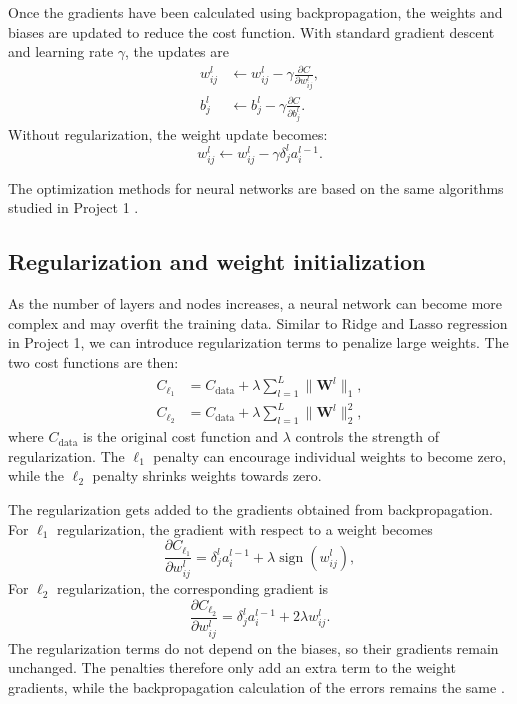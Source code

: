 \documentclass[amssymb,secnumarabic,twocolumn,aps]{revtex4}
\begin{document}
Once the gradients have been calculated using backpropagation, the weights and biases are updated to reduce the cost function. With standard gradient descent and learning rate $\gamma$, the updates are
\begin{align*}
    w_{ij}^l
     & \leftarrow
    w_{ij}^l-\gamma
    \frac{\partial C}{\partial w_{ij}^l}, \\
    b_j^l
     & \leftarrow
    b_j^l-\gamma
    \frac{\partial C}{\partial b_j^l}.
\end{align*}
Without regularization, the weight update becomes:
\begin{equation*}
    w_{ij}^l
    \leftarrow
    w_{ij}^l-\gamma\delta_j^l a_i^{l-1}.
\end{equation*}

The optimization methods for neural networks are based on the same algorithms studied in Project 1 \cite{project1}.

\subsection{Regularization and weight initialization}

As the number of layers and nodes increases, a neural network can become more complex and may overfit the training data. Similar to Ridge and Lasso regression in Project 1, we can introduce regularization terms to penalize large weights. The two cost functions are then:
\begin{align*}
    C_{\ell_1}
     & =C_{\mathrm{data}}
    +\lambda\sum_{l=1}^{L}\|\boldsymbol{W}^l\|_1, \\
    C_{\ell_2}
     & =C_{\mathrm{data}}
    +\lambda\sum_{l=1}^{L}\|\boldsymbol{W}^l\|_2^2,
\end{align*}
where $C_{\mathrm{data}}$ is the original cost function and $\lambda$ controls the strength of regularization. The $\ell_1$ penalty can encourage individual weights to become zero, while the $\ell_2$ penalty shrinks weights towards zero.

The regularization gets added to the gradients obtained from backpropagation. For $\ell_1$ regularization, the gradient with respect to a weight becomes
\begin{equation*}
    \frac{\partial C_{\ell_1}}{\partial w_{ij}^l}
    =
    \delta_j^l a_i^{l-1}
    +\lambda\operatorname{sign}(w_{ij}^l),
\end{equation*}
For $\ell_2$ regularization, the corresponding gradient is
\begin{equation*}
    \frac{\partial C_{\ell_2}}{\partial w_{ij}^l}
    =
    \delta_j^l a_i^{l-1}+2\lambda w_{ij}^l.
\end{equation*}
The regularization terms do not depend on the biases, so their gradients remain unchanged. The penalties therefore only add an extra term to the weight gradients, while the backpropagation calculation of the errors remains the same \cite{lecturebook}.
\end{document}
